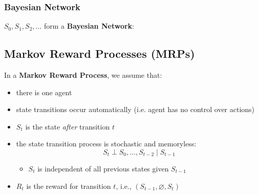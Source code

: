\subsubsection{Bayesian Network}
\begin{definition}
    $S_0,S_1,S_2,\ldots$ form a \textbf{Bayesian Network}:
\end{definition}
\newpage

\subsection{Markov Reward Processes (MRPs)}
\begin{summary}
    In a \textbf{Markov Reward Process}, we assume that:
    \begin{itemize}
        \item there is one agent
        \item state transitions occur automatically (i.e. agent has no control over actions)
        \item $S_t$ is the state \textit{after} transition $t$
        \item the state transition process is stochastic and memoryless:
        \[
        S_t \perp S_0, \dots, S_{t-2} \mid S_{t-1}
        \]
        \begin{itemize}
            \item $S_t$ is independent of all previous states given $S_{t-1}$
        \end{itemize}
        \item $R_t$ is the reward for transition $t$, i.e., $(S_{t-1}, \varnothing, S_t)$
    \end{itemize}
    \vspace{1em}


\end{summary}

